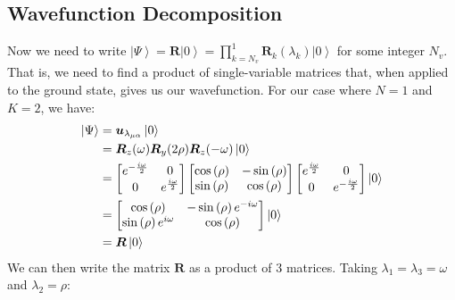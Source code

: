 \documentclass{aux/ttuthes2007}
\newcommand{\ket}[1]{\ensuremath{\left|#1\right\rangle}}
\newcommand{\s}[1]{\sin\left( #1 \right)}
\newcommand{\co}[1]{\cos\left( #1 \right)}
\newcommand{\elec}{N}
\newcommand{\orb}{K}
\newcommand{\ind}[1]{{\uo #1 \oo #1}}
\newcommand{\uo}[1]{
		\IfEqCase{#1}{
			{0}{\mu}
			{1}{\nu}
			{2}{\xi}
		}[\PackageError{uo}{Undefined option to uo: #1}{}]
}
\newcommand{\oo}[1]{
		\IfEqCase{#1}{
			{0}{\alpha}
			{1}{\beta}
			{2}{\gamma}
		}[\PackageError{unocorb}{Undefined option to unuo: #1}{}]
}
\begin{document}
\subsection {\textbf{Wavefunction Decomposition}}
Now we need to write $\ket \Psi = \bm R \ket 0 = \prod_{k=N_v}^1 \bm R_k(\lambda_k) \ket 0$ for some integer $N_v$. That is, we need to find a product of single-variable matrices that, when applied to the ground state, gives us our wavefunction.
For our case where $\elec = 1$ and $\orb = 2$, we have:
%
\begin{equation*}
\begin{split}
	\ket\Psi 
	&= \bm u_{\lambda_{\ind 0}} \ket 0 \\
	&= \bm R_z(\omega) \bm R_y(2\rho) \bm R_z(-\omega)
	\ket 0 \\
	&= 
	\begin{bmatrix}
		e^{-\frac{i\omega} 2} & 0 \\
		0 & e^{\frac{i\omega} 2}\\
	\end{bmatrix} 
	\begin{bmatrix}
		\co \rho & - \s \rho \\
		\s \rho  & \co \rho\\
	\end{bmatrix} 
	\begin{bmatrix}
		e^{\frac{i\omega} 2} & 0 \\
		0 & e^{-\frac{i\omega} 2}\\
	\end{bmatrix} 
	\ket 0 \\
	&=
	\begin{bmatrix}
		\co \rho & - \s \rho e^{-i\omega} \\
		\s \rho e^{i\omega} & \co \rho\\
	\end{bmatrix} 
	\ket 0 \\
	&= \bm R\ket 0
\end{split}
\end{equation*}
%
We can then write the matrix $\bm R$ as a product of 3 matrices. Taking $\lambda_1 = \lambda_3 = \omega$ and $\lambda_2 = \rho$:
%
\end{document}
